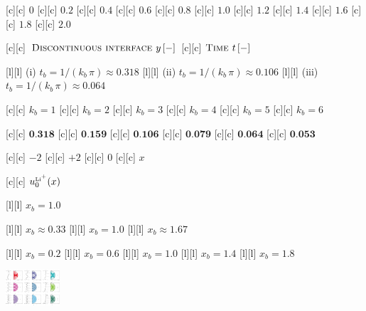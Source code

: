  [c][c] {\tiny $0$}
 [c][c] {\tiny $0.2$}
 [c][c] {\tiny $0.4$}
 [c][c] {\tiny $0.6$}
 [c][c] {\tiny $0.8$}
[c][c] {\tiny $1.0$}
[c][c] {\tiny $1.2$}
[c][c] {\tiny $1.4$}
[c][c] {\tiny $1.6$}
[c][c] {\tiny $1.8$}
[c][c] {\tiny $2.0$}

[c][c] {\scriptsize $\textsc{Discontinuous interface } y\, [-]$}
[c][c] {\scriptsize $\textsc{Time } t\, [-]$}

[l][l] {(i)   $t_{b} = 1/(k_{b}\,\pi) \approx 0.318$}
[l][l] {(ii) $t_{b} = 1/(k_{b}\,\pi) \approx 0.106$}
[l][l] {(iii)   $t_{b} = 1/(k_{b}\,\pi) \approx 0.064$}

[c][c] {$k_{b} = 1$}
[c][c] {$k_{b} = 2$}
[c][c] {$k_{b} = 3$}
[c][c] {$k_{b} = 4$}
[c][c] {$k_{b} = 5$}
[c][c] {$k_{b} = 6$}

[c][c] {\tiny $\textbf{0.318}$}
[c][c] {\tiny $\textbf{0.159}$}
[c][c] {\tiny $\textbf{0.106}$}
[c][c] {\tiny $\textbf{0.079}$}
[c][c] {\tiny $\textbf{0.064}$}
[c][c] {\tiny $\textbf{0.053}$}

[c][c] {\tiny $-2$}
[c][c] {\tiny $+2$}
[c][c]   {\tiny $0$}
[c][c]   {\tiny $x$}

[c][c]  {\tiny $u_{0}^{\text{\tiny Li}^{\tiny +}}(x)$}

[l][l] {\tiny $x_{b} = 1.0$}

[l][l] {\tiny $x_{b} \approx 0.33$}
[l][l] {\tiny $x_{b} = 1.0$}
[l][l] {\tiny $x_{b} \approx 1.67$}

[l][l] {\tiny $x_{b} = 0.2$}
[l][l] {\tiny $x_{b} = 0.6$}
[l][l] {\tiny $x_{b} = 1.0$}
[l][l] {\tiny $x_{b} = 1.4$}
[l][l] {\tiny $x_{b} = 1.8$}

\includegraphics[width=0.15\textwidth]{characsin_rotate_semicircle_135246mix_vertical.eps}